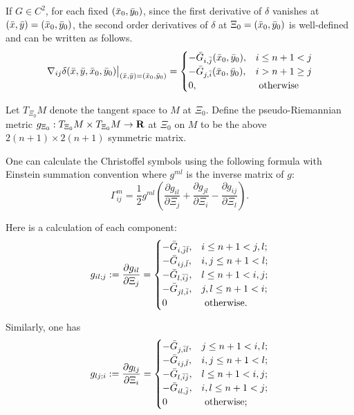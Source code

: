If $G\in C^2$, for each fixed $(\bar{x}_0, \bar{y}_0)$, since the first derivative of $\delta$ vanishes at $(\bar{x}, \bar{y}) = (\bar{x}_0, \bar{y}_0)$,  
the second order derivatives of $\delta$ at $\Xi_0 = (\bar{x}_0, \bar{y}_0)$ is well-defined and can be written as follows.
\begin{equation}\label{pseudo_metric}
	\nabla_{ij} \delta (\bar{x}, \bar{y}, \bar{x}_0, \bar{y}_0){\big|}_{(\bar{x}, \bar{y}) = (\bar{x}_0, \bar{y}_0)}
	=\begin{cases}
	-\bar{G}_{i,\bar{j}}(\bar{x}_0, \bar{y}_0),& i\le n+1 < j\\
	-\bar{G}_{j, \bar{i}}(\bar{x}_0, \bar{y}_0),& i>n+1 \ge j\\
	0,& \text{ otherwise}
	\end{cases}
\end{equation}  

Let $T_{\Xi_0}M$ denote the tangent space to $M$ at ${\Xi_0}$. Define the pseudo-Riemannian metric $ g_{\Xi_0}: T_{\Xi_0}M\times T_{\Xi_0}M \rightarrow {\mathbf R}$ at $\Xi_0$ on $M$ to be the above $2(n+1) \times 2(n+1)$ symmetric matrix.\medskip

One can calculate the Christoffel symbols using the following formula with Einstein summation convention where $g^{ml}$ is the inverse matrix of $g$:
\begin{equation}\label{Gamma}
	\Gamma_{ij}^m = \frac{1}{2} g^{ml}\left(\frac{\partial g_{il}}{\partial \Xi_j} + \frac{\partial g_{jl}}{\partial \Xi_i} - \frac{\partial g_{ij}}{\partial \Xi_l}\right).
\end{equation}

Here is a calculation of each component:
\begin{equation}
g_{il;j}:=	\frac{\partial g_{il}}{\partial \Xi_j} = \begin{cases}
-	\bar{G}_{i, \bar{j}\bar{l}}, & i \le n+1 < j, l; \\
-	\bar{G}_{ij, \bar{l}}, & i,j \le n+1 <l; \\
-	\bar{G}_{l, \bar{i}\bar{j}}, & l \le n+1 <i,j; \\
-	\bar{G}_{jl, \bar{i}}, & j,l \le  n+1<i ; \\
	0 & \text{ otherwise}.
	\end{cases}
\end{equation}

Similarly, one has
\begin{equation}
g_{lj;i}:=\frac{\partial g_{lj}}{\partial \Xi_i} = \begin{cases}
-\bar{G}_{j, \bar{i}\bar{l}}, & j \le n+1 < i, l; \\
-\bar{G}_{ij, \bar{l}}, & i,j \le n+1 <l; \\
-\bar{G}_{l, \bar{i}\bar{j}}, & l \le n+1 < i,j; \\
-\bar{G}_{il, \bar{j}}, &  i,l \le n+1 <j ; \\
0 & \text{ otherwise};
\end{cases}
\end{equation}

